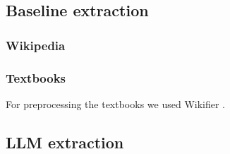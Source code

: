 \documentclass{article}
\begin{document}
\subsection{Baseline extraction}
\subsubsection{Wikipedia}

\subsubsection{Textbooks}


For preprocessing the textbooks we used Wikifier \citep{brank2017annotating}.


\subsection{LLM extraction}
\end{document}
